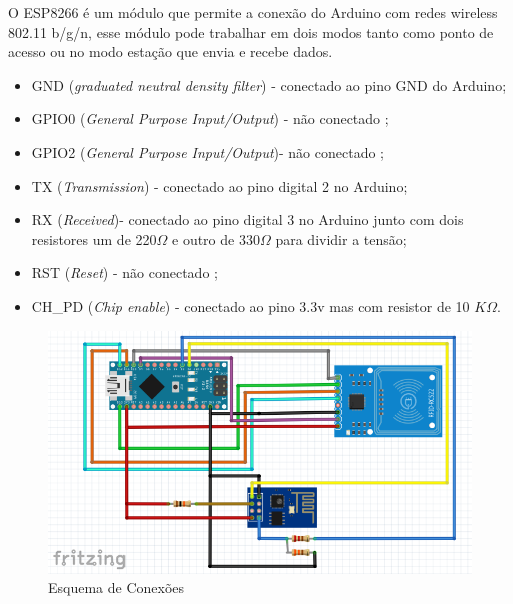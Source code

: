 \par
O ESP8266 é um módulo que permite a conexão do Arduino com redes wireless 802.11 b/g/n, esse módulo pode 
trabalhar em dois modos tanto como ponto de acesso ou no modo estação que envia e recebe dados. 
\begin{itemize}
    \item GND (\textit{graduated neutral density filter}) - conectado ao pino GND do Arduino;
    \item GPIO0 (\textit{General Purpose Input/Output}) - não conectado ;
    \item GPIO2 (\textit{General Purpose Input/Output})- não conectado ; 
    \item TX (\textit{Transmission}) - conectado ao pino digital 2 no Arduino;
    \item RX (\textit{Received})- conectado ao pino digital 3 no Arduino junto com dois resistores um de 220$\Omega$ e outro de 330$\Omega$ para dividir a tensão;
    \item RST (\textit{Reset}) - não conectado ;
    \item CH\_PD (\textit{Chip enable}) - conectado ao pino 3.3v mas com resistor de 10 $K\Omega$.
\end{itemize}


\begin{figure}[H]
              \caption{\label{fig:esq_conexoes}{Esquema de Conexões}}
              \centering
              \includegraphics[width=1\textwidth]{Figuras/esquema_de_conexoes2.PNG}
\end{figure}

